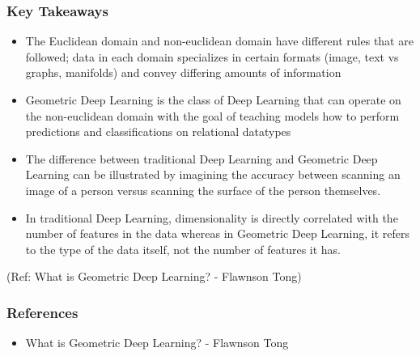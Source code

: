 \begin{frame}[fragile]\frametitle{Key Takeaways
}


\begin{itemize}
\item  The Euclidean domain and non-euclidean domain have different rules that are followed; data in each domain specializes in certain formats (image, text vs graphs, manifolds) and convey differing amounts of information
\item  Geometric Deep Learning is the class of Deep Learning that can operate on the non-euclidean domain with the goal of teaching models how to perform predictions and classifications on relational datatypes
\item  The difference between traditional Deep Learning and Geometric Deep Learning can be illustrated by imagining the accuracy between scanning an image of a person versus scanning the surface of the person themselves.
\item  In traditional Deep Learning, dimensionality is directly correlated with the number of features in the data whereas in Geometric Deep Learning, it refers to the type of the data itself, not the number of features it has.
\end{itemize}
	  
{\tiny (Ref: What is Geometric Deep Learning? - Flawnson Tong)}

\end{frame}

\begin{frame}[fragile]\frametitle{References}

\begin{itemize}
\item What is Geometric Deep Learning? - Flawnson Tong
\end{itemize}
	  
\end{frame}
